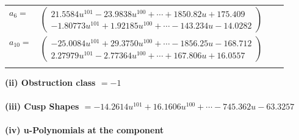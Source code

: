 \documentclass[1p]{elsarticle_modified}
\theoremstyle{definition}
\begin{document}
\begin{tabular}{m{7pt} m{180pt} m{7pt} m{180pt} }
\flushright $a_{6}=$&$\begin{pmatrix}21.5584 u^{101}-23.9838 u^{100}+\cdots+1850.82 u+175.409\\-1.80773 u^{101}+1.92185 u^{100}+\cdots-143.234 u-14.0282\end{pmatrix}$ \\
\flushright $a_{10}=$&$\begin{pmatrix}-25.0084 u^{101}+29.3750 u^{100}+\cdots-1856.25 u-168.712\\2.27979 u^{101}-2.77364 u^{100}+\cdots+167.806 u+16.0557\end{pmatrix}$\\&\end{tabular}
\flushleft \textbf{(ii) Obstruction class $= -1$}\\~\\
\flushleft \textbf{(iii) Cusp Shapes $= -14.2614 u^{101}+16.1606 u^{100}+\cdots-745.362 u-63.3257$}\\~\\
\newpage\renewcommand{\arraystretch}{1}
\flushleft \textbf{(iv) u-Polynomials at the component}\newline \\
\end{document}
